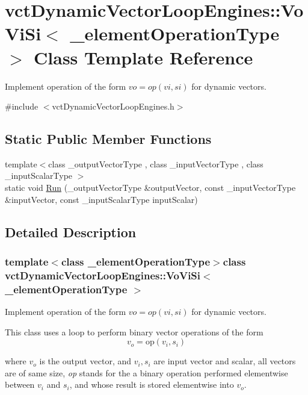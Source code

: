 \hypertarget{classvct_dynamic_vector_loop_engines_1_1_vo_vi_si}{\section{vct\-Dynamic\-Vector\-Loop\-Engines\-:\-:Vo\-Vi\-Si$<$ \-\_\-element\-Operation\-Type $>$ Class Template Reference}
\label{classvct_dynamic_vector_loop_engines_1_1_vo_vi_si}
}


Implement operation of the form $vo = op(vi, si)$ for dynamic vectors.  




{\ttfamily \#include $<$vct\-Dynamic\-Vector\-Loop\-Engines.\-h$>$}

\subsection*{Static Public Member Functions}
\begin{DoxyCompactItemize}
\item 
{\footnotesize template$<$class \-\_\-output\-Vector\-Type , class \-\_\-input\-Vector\-Type , class \-\_\-input\-Scalar\-Type $>$ }\\static void \hyperlink{classvct_dynamic_vector_loop_engines_1_1_vo_vi_si_abcae46b3652d4090c5157d58e70b256a}{Run} (\-\_\-output\-Vector\-Type \&output\-Vector, const \-\_\-input\-Vector\-Type \&input\-Vector, const \-\_\-input\-Scalar\-Type input\-Scalar)
\end{DoxyCompactItemize}


\subsection{Detailed Description}
\subsubsection*{template$<$class \-\_\-element\-Operation\-Type$>$class vct\-Dynamic\-Vector\-Loop\-Engines\-::\-Vo\-Vi\-Si$<$ \-\_\-element\-Operation\-Type $>$}

Implement operation of the form $vo = op(vi, si)$ for dynamic vectors. 

This class uses a loop to perform binary vector operations of the form \[ v_o = \mathrm{op}(v_i, s_i) \]

where $v_o$ is the output vector, and $v_i, s_i$ are input vector and scalar, all vectors are of same size, {\itshape op} stands for the a binary operation performed elementwise between $v_i$ and $s_i$, and whose result is stored elementwise into $v_o$.


